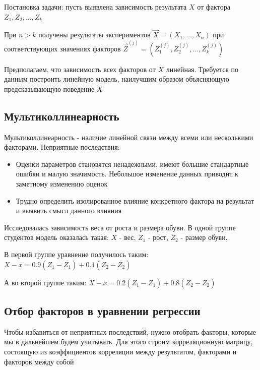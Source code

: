 \documentclass[12pt]{article}
\begin{document}
Постановка задачи: пусть выявлена зависимость результата $X$ от фактора $Z_1, Z_2, \dots, Z_k$

При $n > k$ получены результаты экспериментов $\vec X = (X_1, \dots, X_n)$ при соответствующих значениях факторов $\vec Z^{(j)} = (Z^{(j)}_1, Z^{(j)}_2, \dots, Z^{(j)}_k)$

Предполагаем, что зависимость всех факторов от $X$ линейная. Требуется по данным построить линейную модель, наилучшим образом объясняющую предсказывающую поведение $X$

\subsection{Мультиколлинеарность}

\hypertarget{multicollinearity}{}

\Def Мультиколлинеарность - наличие линейной связи между всеми или несколькими факторами. Неприятные последствия:

\begin{itemize}
    \item Оценки параметров становятся ненадежными, имеют большие стандартные ошибки и малую значимость.
    Небольшое изменение данных приводит к заметному изменению оценок
    \item Трудно определить изолированное влияние конкретного фактора на результат и выявить смысл данного влияния
\end{itemize}

\Ex Исследовалась зависимость веса от роста и размера обуви. В одной группе студентов модель оказалась такая: 
$X$ - вес, $Z_1$ - рост, $Z_2$ - размер обуви, 

В первой группе уравнение получилось таким: $X - \overline{x} = 0.9(Z_1 - \overline{Z_1}) + 0.1(Z_2 - \overline{Z_2})$

А во второй группе таким: $X - \overline{x} = 0.2(Z_1 - \overline{Z_1}) + 0.8(Z_2 - \overline{Z_2})$

\subsection{Отбор факторов в уравнении регрессии}

Чтобы избавиться от неприятных последствий, нужно отобрать факторы, которые мы в дальнейшем будем учитывать. Для этого строим корреляционную матрицу, состоящую из коэффициентов корреляции между результатом, факторами и факторов между собой 

\smallvspace
\end{document}
